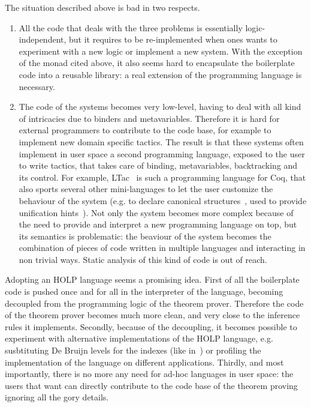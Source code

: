 \documentclass[preprint]{sigplanconf}
\begin{document}
The situation described above is bad in two respects.
\begin{enumerate}
\item All the code that deals with the three problems is essentially logic-independent, but it requires to be re-implemented when ones wants to experiment with a new logic or implement a new system. With the exception of the monad cited above, it also seems hard to encapsulate the boilerplate code into a reusable library: a real extension of the programming language is necessary.
\item The code of the systems becomes very low-level, having to deal with all kind of intricacies due to binders and metavariables. Therefore it is hard for external programmers to contribute to the code base, for example to implement new domain specific tactics. The result is that these systems often implement in user space a second programming language, exposed to the user to write tactics, that takes care of binding, metavariables, backtracking and its control. For example, LTac~\cite{delahaye2000} is such a programming language for Coq, that also sports several other mini-languages to let the user customize the behaviour of the system (e.g. to declare canonical structures~\cite{canstruct}, used to provide unification hints~\cite{asperti1}). Not only the system becomes more complex because of the need to provide and interpret a new programming language on top, but its semantics is problematic: the beaviour of the system becomes the combination of pieces of code written in multiple languages and interacting in non trivial ways. Static analysis of this kind of code is out of reach.
\end{enumerate}

Adopting an HOLP language seems a promising idea. First of all the boilerplate code is pushed once and for all in the interpreter of the language, becoming decoupled from the programming logic of the theorem prover. Therefore the code of the theorem prover becomes much more clean, and very close to the inference rules it implements. Secondly, because of the decoupling, it becomes possible to experiment with alternative implementations of the HOLP language, e.g. susbtituting De Bruijn levels for the indexes (like in~\cite{debrujn1}) or profiling the implementation of the language on different applications. Thirdly, and most importantly, there is no more any need for ad-hoc languages in user space: the users that want can directly contribute to the code base of the theorem proving ignoring all the gory details.
\end{document}
